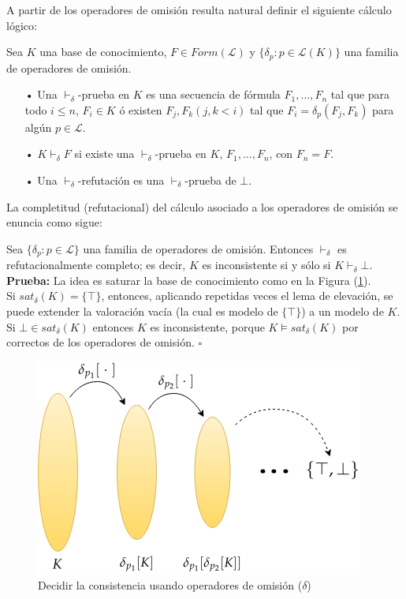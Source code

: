 A partir de los operadores de omisión resulta natural definir el siguiente cálculo lógico:

 \label{def:prueba} Sea $K$ una base de conocimiento, $F\in Form(\mathcal{L})$ y $\{ \delta_p : p \in \mathcal{L}(K) \}$ una familia de operadores de omisión.
\begin{itemize}
\item[•]Una  $\vdash_{\delta}$-prueba en $K$ es una secuencia de fórmula $F_1, \dots ,F_n$ tal que para todo $i \leq n$, $F_i \in K$ ó existen $F_j , F_k (j,k < i)$ tal que $F_i = \delta_p (F_j , F_k)$ para algún $p \in \mathcal{L}$.
\item[•] $K \vdash_{\delta} F$ si existe una $\vdash_{\delta}$-prueba en $K$, $F_1, \dots ,F_n$, con $F_n = F$.
\item[•] Una $\vdash_{\delta}$-refutación es una $\vdash_{\delta}$-prueba de $\bot$.
\end{itemize}

La completitud (refutacional) del cálculo asociado a los operadores de omisión se enuncia como sigue:

\thm \label{teo:completo} Sea $\{ \delta_p : p \in \mathcal{L} \}$ una familia de operadores de omisión. Entonces $\vdash_{\delta}$ es refutacionalmente completo; es decir, $K$ es inconsistente si y sólo si $K \vdash_{\delta} \bot$.\\

\noindent \textbf{Prueba:} La idea es saturar la base de conocimiento como en la Figura (\ref{fig:comple}). \\ 
Si $sat_{\delta} (K) = \{ \top \}$, entonces, aplicando repetidas veces el lema de elevación, se puede extender la valoración vacía (la cual es modelo de $\{ \top \}$) a un modelo de $K$.\\
Si $\bot \in sat_{\delta} (K)$ entonces $K$ es inconsistente, porque $K \vDash sat_{\delta} (K)$ por correctos de los operadores de omisión. $\square$ %

\vspace{0.5cm}
\begin{figure}[h]
	\centering
		\includegraphics[scale=0.8]{imagenes/comple.png}
	\caption{Decidir la consistencia usando operadores de omisión ($\delta$)}
	\label{fig:comple}
\end{figure}
\vspace{0.5cm}

